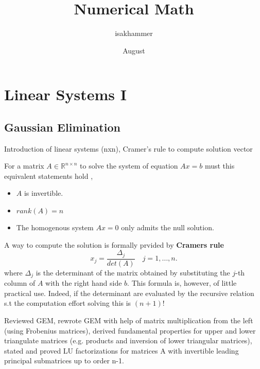 \documentclass{article}
\title{Numerical Math}
\author{isakhammer }
\date{August}
\theoremstyle{remark}
\begin{document}
\maketitle
\tableofcontents
\newpage

\newpage
\section{Linear Systems I}%
\label{sec:linear_systems_i}
\subsection{Gaussian Elimination}%
\label{sub:gaussian_elimination}

\begin{tcolorbox}
  Introduction of linear systems (nxn), Cramer's rule to compute solution vector
\end{tcolorbox}

For a matrix $A \in \mathbb{R}^{n\times n }$ to solve the system of equation $Ax = b$ must this equivalent statements hold ,
\begin{itemize}
  \item $A$ is invertible.
  \item $rank\left( A \right) = n$ 
    \item The homogenous system $Ax = 0$ only admits the null solution.
\end{itemize}

A way to compute the solution is formally prvided by \textbf{Cramers rule} 
\begin{equation}
\label{eq:cramers-rule}
x_{j} = \frac{\Delta_j}{det\left( A \right)} \quad j = 1,\ldots,n 
.\end{equation}
where $\Delta_j$ is the determinant of the matrix obtained by substituting the $j$-th column of $A$ with the right hand side $b$. This formula is, however, of little practical use. Indeed, if the determinant are evaluated by the recursive relation s.t the computation effort solving this is $\left( n+1 \right)!$

 \begin{tcolorbox}
   Reviewed GEM, rewrote GEM with help of matrix multiplication from the left (using Frobenius matrices), derived fundamental properties for upper and lower triangulate matrices (e.g. products and inversion of lower triangular matrices), stated and proved LU factorizations for matrices A with invertible leading principal submatrices up to order n-1.
 \end{tcolorbox}
\end{document}
